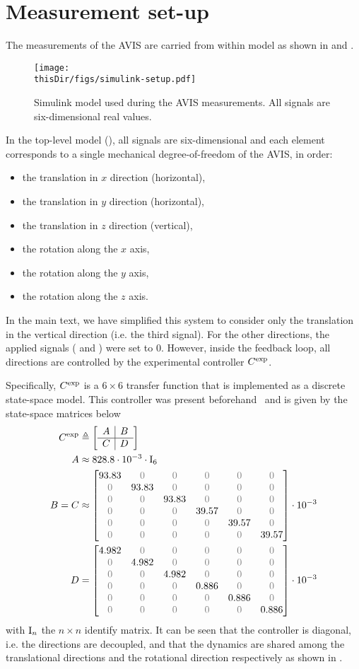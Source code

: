 
\section{Measurement set-up}
The measurements of the \gls{AVIS} are carried from within \Simulink model as shown in  and .

\begin{figure}
\setlength\figurewidth{\columnwidth}
  \texttt{[image: \\thisDir/figs/simulink-setup.pdf]}
  \caption{Simulink model used during the AVIS measurements. All signals are six-dimensional real values.}
  \label{fig:avis:simulink:setup}
\end{figure}

In the top-level model (), all signals are six-dimensional and each element corresponds to a single mechanical degree-of-freedom of the \gls{AVIS}, in order:
\begin{itemize}
  \item the translation in $x$ direction (horizontal),
  \item the translation in $y$ direction (horizontal),
  \item the translation in $z$ direction (vertical),
  \item the rotation along the $x$ axis,
  \item the rotation along the $y$ axis,
  \item the rotation along the $z$ axis.
\end{itemize}
In the main text, we have simplified this system to consider only the translation in the vertical direction (i.e. the third signal).
For the other directions, the applied signals ( and ) were set to $0$.
However, inside the feedback loop, all directions are controlled by the experimental controller $C^{\mathrm{exp}}$.

Specifically, $C^{\mathrm{exp}}$ is a $6\times6$ transfer function that is implemented as a discrete state-space model.
This controller was present beforehand~\citep{Rademakers2005MSc,vanderMaas2011MSc} and is given by the state-space matrices below
\begin{align}
  \experimental\Controller & \isdef \stateSpace{A}{B}{C}{D}\\
  A       &\approx 828.8 \cdot 10^{-3} \cdot \Identity{6} \\
  B = C &\approx \AvisMatrixDiagonal{93.83}{39.57} \cdot 10^{-3}\\
  D       &= \AvisMatrixDiagonal{4.982}{0.886} \cdot 10^{-3}
\end{align}
with $\mathrm{I}_{n}$ the $n\times n$ identify matrix.
It can be seen that the controller is diagonal, i.e. the directions are decoupled, and that the dynamics are shared among the translational directions and the rotational direction respectively as shown in .

